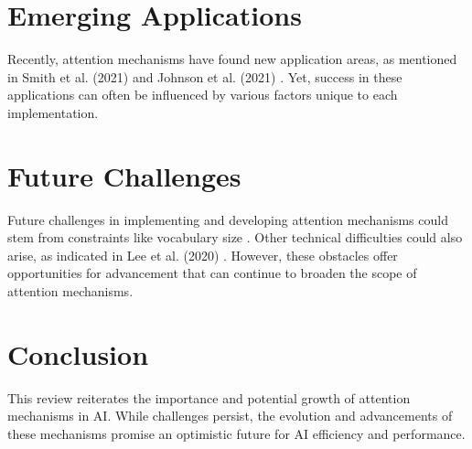\documentclass[10pt,conference]{IEEEtran}
\begin{document}
\section{Emerging Applications}

Recently, attention mechanisms have found new application areas, as mentioned in Smith et al. (2021) and Johnson et al. (2021) \cite{smith2021,johnson2021}. Yet, success in these applications can often be influenced by various factors unique to each implementation.

\section{Future Challenges}

Future challenges in implementing and developing attention mechanisms could stem from constraints like vocabulary size \cite{kim2014}. Other technical difficulties could also arise, as indicated in Lee et al. (2020) \cite{lee2020}. However, these obstacles offer opportunities for advancement that can continue to broaden the scope of attention mechanisms.

\section{Conclusion}

This review reiterates the importance and potential growth of attention mechanisms in AI. While challenges persist, the evolution and advancements of these mechanisms promise an optimistic future for AI efficiency and performance.

{}

\end{document}
